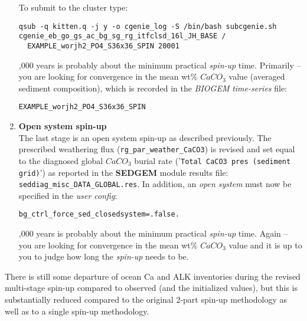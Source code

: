 \documentclass[11pt,fleqn]{book} %
\begin{document}
\begin{enumerate}
\noindent To submit to the cluster type:
\vspace{-1mm}\begin{verbatim}qsub -q kitten.q -j y -o cgenie_log -S /bin/bash subcgenie.sh
cgenie_eb_go_gs_ac_bg_sg_rg_itfclsd_16l_JH_BASE /
  EXAMPLE_worjh2_PO4_S36x36_SPIN 20001
\end{verbatim}\vspace{-1mm}

,000 years is probably about the minimum practical \textit{spin-up} time. Primarily -- you are looking for convergence in the mean wt\% \(CaCO_{3}\) value (averaged sediment composition), which is recorded in the \textit{BIOGEM} \textit{time-series} file:
\vspace{-1mm}\begin{verbatim}EXAMPLE_worjh2_PO4_S36x36_SPIN\end{verbatim}\vspace{-1mm}

\vspace{1mm}
\item \textbf{Open system spin-up}
\\The last stage is an open system spin-up as described previously. The prescribed weathering flux (\texttt{rg\_par\_weather\_CaCO3}) is revised and set equal to the diagnosed global \(CaCO_{3}\) burial rate ('\texttt{Total CaCO3 pres (sediment grid)}') as reported in the \textbf{SEDGEM} module results file:
\\\texttt{seddiag\_misc\_DATA\_GLOBAL.res}.
In addition, an \textit{open system} must now be specified in the \textit{user config}:
\vspace{-1mm}\begin{verbatim}bg_ctrl_force_sed_closedsystem=.false.\end{verbatim}\vspace{-1mm}

,000 years is probably about the minimum practical \textit{spin-up} time. Again -- you are looking for convergence in the mean wt\% \(CaCO_{3}\) value and it is up to you to judge how long the \textit{spin-up} needs to be.

\end{enumerate}

There is still some departure of ocean Ca and ALK inventories during the revised multi-stage spin-up compared to observed (and the initialized values), but this is substantially reduced compared to the original 2-part spin-up methodology as well as to a single spin-up methodology.
\end{document}
